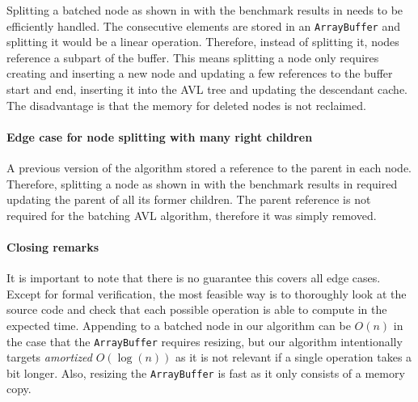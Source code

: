 Splitting a batched node as shown in  with the benchmark results in  needs to be efficiently handled. The consecutive elements are stored in an \texttt{ArrayBuffer} and splitting it would be a linear operation. Therefore, instead of splitting it, nodes reference a subpart of the buffer. This means splitting a node only requires creating and inserting a new node and updating a few references to the buffer start and end, inserting it into the AVL tree and updating the descendant cache. The disadvantage is that the memory for deleted nodes is not reclaimed.



\paragraph{Edge case for node splitting with many right children}

A previous version of the algorithm stored a reference to the parent in each node. Therefore, splitting a node as shown in  with the benchmark results in  required updating the parent of all its former children. The parent reference is not required for the \gls{batching AVL algorithm}, therefore it was simply removed.

\paragraph{Closing remarks}

It is important to note that there is no guarantee this covers all edge cases. Except for formal verification, the most feasible way is to thoroughly look at the source code and check that each possible operation is able to compute in the expected time. Appending to a batched node in our algorithm can be $O(n)$ in the case that the \texttt{ArrayBuffer} requires resizing, but our algorithm intentionally targets \textit{amortized} $O(\log(n))$ as it is not relevant if a single operation takes a bit longer. Also, resizing the \texttt{ArrayBuffer} is fast as it only consists of a memory copy.

